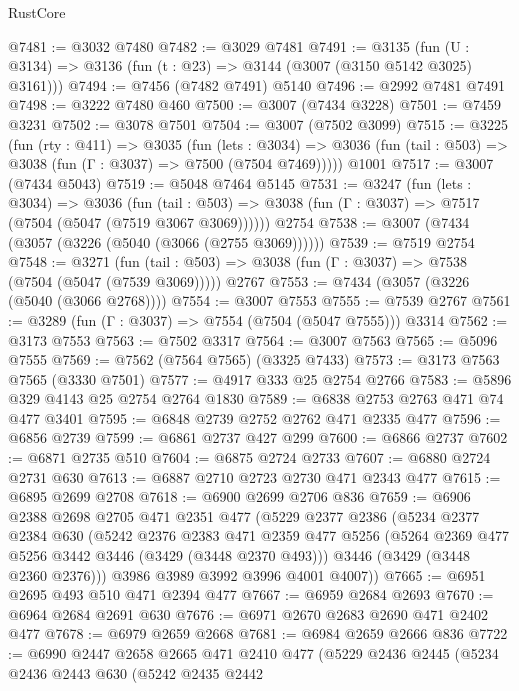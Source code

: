 \begin{lexlean}{RustCore}
\begin{coremodule}
@7481 := @3032 @7480
@7482 := @3029 @7481
@7491 := @3135 (fun (U : @3134) => @3136 (fun (t : @23) => @3144 (@3007 (@3150 @5142 @3025) @3161)))
@7494 := @7456 (@7482 @7491) @5140
@7496 := @2992 @7481 @7491
@7498 := @3222 @7480 @460
@7500 := @3007 (@7434 @3228)
@7501 := @7459 @3231
@7502 := @3078 @7501
@7504 := @3007 (@7502 @3099)
@7515 := @3225
    (fun (rty : @411) =>
    @3035
      (fun (lets : @3034) =>
      @3036 (fun (tail : @503) => @3038 (fun (Γ : @3037) => @7500 (@7504 @7469)))))
    @1001
@7517 := @3007 (@7434 @5043)
@7519 := @5048 @7464 @5145
@7531 := @3247
    (fun (lets : @3034) =>
    @3036
      (fun (tail : @503) => @3038 (fun (Γ : @3037) => @7517 (@7504 (@5047 (@7519 @3067 @3069))))))
    @2754
@7538 := @3007 (@7434 (@3057 (@3226 (@5040 (@3066 (@2755 @3069))))))
@7539 := @7519 @2754
@7548 := @3271
    (fun (tail : @503) => @3038 (fun (Γ : @3037) => @7538 (@7504 (@5047 (@7539 @3069)))))
    @2767
@7553 := @7434 (@3057 (@3226 (@5040 (@3066 @2768))))
@7554 := @3007 @7553
@7555 := @7539 @2767
@7561 := @3289 (fun (Γ : @3037) => @7554 (@7504 (@5047 @7555))) @3314
@7562 := @3173 @7553
@7563 := @7502 @3317
@7564 := @3007 @7563
@7565 := @5096 @7555
@7569 := @7562 (@7564 @7565) (@3325 @7433)
@7573 := @3173 @7563 @7565 (@3330 @7501)
@7577 := @4917 @333 @25 @2754 @2766
@7583 := @5896 @329 @4143 @25 @2754 @2764 @1830
@7589 := @6838 @2753 @2763 @471 @74 @477 @3401
@7595 := @6848 @2739 @2752 @2762 @471 @2335 @477
@7596 := @6856 @2739
@7599 := @6861 @2737 @427 @299
@7600 := @6866 @2737
@7602 := @6871 @2735 @510
@7604 := @6875 @2724 @2733
@7607 := @6880 @2724 @2731 @630
@7613 := @6887 @2710 @2723 @2730 @471 @2343 @477
@7615 := @6895 @2699 @2708
@7618 := @6900 @2699 @2706 @836
@7659 := @6906
    @2388
    @2698
    @2705
    @471
    @2351
    @477
    (@5229
      @2377
      @2386
      (@5234
        @2377
        @2384
        @630
        (@5242
          @2376
          @2383
          @471
          @2359
          @477
          @5256
          (@5264 @2369 @477 @5256 @3442 @3446 (@3429 (@3448 @2370 @493)))
          @3446
          (@3429 (@3448 @2360 @2376)))
        @3986
        @3989
        @3992
        @3996
        @4001
        @4007))
@7665 := @6951 @2695 @493 @510 @471 @2394 @477
@7667 := @6959 @2684 @2693
@7670 := @6964 @2684 @2691 @630
@7676 := @6971 @2670 @2683 @2690 @471 @2402 @477
@7678 := @6979 @2659 @2668
@7681 := @6984 @2659 @2666 @836
@7722 := @6990
    @2447
    @2658
    @2665
    @471
    @2410
    @477
    (@5229
      @2436
      @2445
      (@5234
        @2436
        @2443
        @630
        (@5242
          @2435
          @2442

\end{coremodule}
\end{lexlean}
